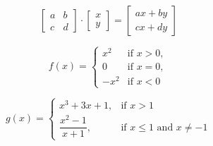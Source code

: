 \documentclass{article}
\begin{document}
\[
  \begin{bmatrix}
    a & b \\
    c & d
  \end{bmatrix}
  \cdot
  \begin{bmatrix}
    x \\
    y
  \end{bmatrix}
  =
  \begin{bmatrix}
    ax+by \\
    cx+dy
  \end{bmatrix}
\]

\[
  f(x)=
  \begin{cases}
    x^2  & \text{if } x>0, \\
    0    & \text{if } x=0, \\
    -x^2 & \text{if } x<0
  \end{cases}
\]

\[
  g(x)=\left\{
  \begin{array}{ll}
    x^3+3x+1,               & \text{if } x > 1                           \\
    \dfrac{x^2 - 1}{x + 1}, & \text{if } x \leq 1 \text{ and } x \neq -1
  \end{array}
  \right.
\]
\end{document}
